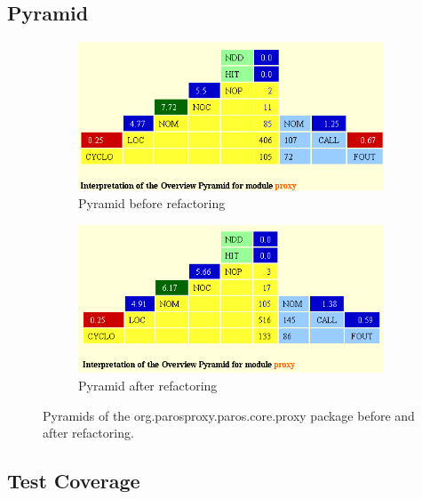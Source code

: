 \subsection{Pyramid}
\begin{figure}[h]
	\begin{subfigure}{0.5\textwidth}
		\centering
		\includegraphics[width=0.9\linewidth]{../Diagrams/pyramidPreRefactoringNoInfo}
		\caption{Pyramid before refactoring}
		\label{fig:sfig1}
	\end{subfigure}%
	\begin{subfigure}{0.5\textwidth}
		\centering
		\includegraphics[width=0.9\linewidth]{../Diagrams/pyramidPostRefactoringNoInfo}
		\caption{Pyramid after refactoring}
		\label{fig:sfig2}
	\end{subfigure}
	\caption{Pyramids of the org.parosproxy.paros.core.proxy package before and after refactoring.}
	\label{fig:fig}
\end{figure}

\subsection{Test Coverage}